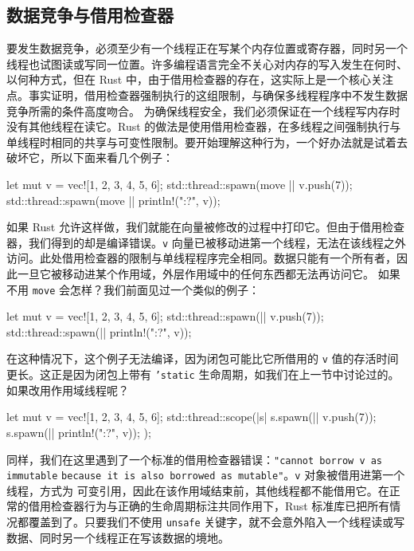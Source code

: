 \subsection{数据竞争与借用检查器}
\label{idx:idx_a13611f5}
\label{idx:idx_c28c4c2b}
要发生数据竞争，必须至少有一个线程正在写某个内存位置或寄存器，同时另一个线程也试图读或写同一位置。许多编程语言完全不关心对内存的写入发生在何时、以何种方式，但在 Rust 中，由于借用检查器的存在，这实际上是一个核心关注点。事实证明，借用检查器强制执行的这组限制，与确保多线程程序中不发生数据竞争所需的条件高度吻合。
\label{idx:idx_fc3ef693}
\label{idx:idx_1b52bf1a}
为确保线程安全，我们必须保证在一个线程写内存时没有其他线程在读它。Rust 的做法是使用借用检查器，在多线程之间强制执行与单线程时相同的共享与可变性限制。要开始理解这种行为，一个好办法就是试着去破坏它，所以下面来看几个例子：
\begin{codebox}[rust]
let mut v = vec![1, 2, 3, 4, 5, 6];
std::thread::spawn(move || v.push(7));
std::thread::spawn(move || println!("{:?}", v));
\end{codebox}
如果 Rust 允许这样做，我们就能在向量被修改的过程中打印它。但由于借用检查器，我们得到的却是编译错误。\texttt{v} 向量已被移动进第一个线程，无法在该线程之外访问。此处借用检查器的限制与单线程程序完全相同。数据只能有一个所有者，因此一旦它被移动进某个作用域，外层作用域中的任何东西都无法再访问它。
如果不用 \texttt{move} 会怎样？我们前面见过一个类似的例子：
\begin{codebox}[rust]
let mut v = vec![1, 2, 3, 4, 5, 6];
std::thread::spawn(|| v.push(7));
std::thread::spawn(|| println!("{:?}", v));
\end{codebox}
\label{idx:idx_0c98824f}
\label{idx:idx_f9d7fcea}
在这种情况下，这个例子无法编译，因为闭包可能比它所借用的 \texttt{v} 值的存活时间更长。这正是因为闭包上带有 \texttt{'static} 生命周期，如我们在上一节中讨论过的。
如果改用作用域线程呢？
\begin{codebox}[rust]
let mut v = vec![1, 2, 3, 4, 5, 6];
std::thread::scope(|s| {
    s.spawn(|| v.push(7));
    s.spawn(|| println!("{:?}", v));
});
\end{codebox}
\label{idx:idx_f8aee235}
同样，我们在这里遇到了一个标准的借用检查器错误：\texttt{"cannot borrow v as immutable}
\label{idx:idx_394a07de}
\texttt{because it is also borrowed as mutable"}。\texttt{v} 对象被借用进第一个线程，方式为
可变引用，因此在该作用域结束前，其他线程都不能借用它。在正常的借用检查器行为与正确的生命周期标注共同作用下，Rust 标准库已把所有情况都覆盖到了。只要我们不使用 \texttt{unsafe} 关键字，就不会意外陷入一个线程读或写数据、同时另一个线程正在写该数据的境地。
